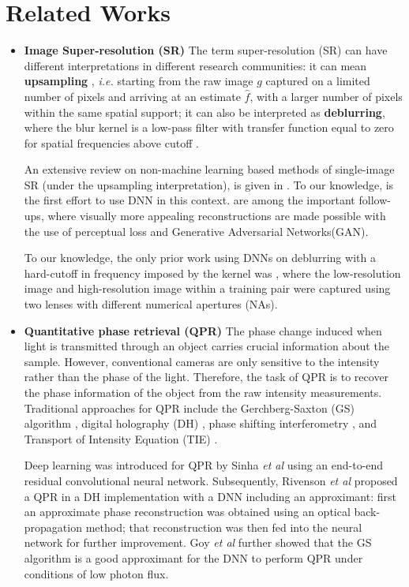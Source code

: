 \documentclass[10pt,twocolumn,letterpaper]{article}
\begin{document}
\section{Related Works}
\begin{itemize}
\item \textbf{Image Super-resolution (SR)}
The term super-resolution (SR) can have different interpretations in different research communities: it can mean \textbf{upsampling} \cite{dong2014learning}, {\it i.e.} starting from the raw image $g$ captured on a limited number of pixels and arriving at an estimate $\hat{f}$, with a larger number of pixels within the same spatial support; it can also be interpreted as \textbf{deblurring}, where the blur kernel is a low-pass filter with transfer function equal to zero for spatial frequencies above cutoff \cite{goodman2005introduction}. 

An extensive review on non-machine learning based methods of single-image SR (under the upsampling interpretation), is given in \cite{yang2014single}. To our knowledge, \cite{dong2014learning} is the first effort to use DNN in this context. \cite{johnson2016perceptual,ledig2017photo} are among the important follow-ups, where visually more appealing reconstructions are made possible with the use of perceptual loss\cite{johnson2016perceptual} and Generative Adversarial Networks(GAN)\cite{goodfellow2014generative}.

To our knowledge, the only prior work using DNNs on deblurring with a hard-cutoff in frequency imposed by the kernel was \cite{rivenson2017deep}, where the low-resolution image and high-resolution image within a training pair were captured using two lenses with different numerical apertures (NAs). 

\item \textbf{Quantitative phase retrieval (QPR)}
The phase change induced when light is transmitted through an object carries crucial information about the sample. However, conventional cameras are only sensitive to the intensity rather than the phase of the light. Therefore, the task of QPR is to recover the phase information of the object from the raw intensity measurements. 
Traditional approaches for QPR include the Gerchberg-Saxton (GS) algorithm \cite{gerchberg1972practical}, digital holography (DH) \cite{goodman1967digital}, phase shifting interferometry \cite{creath1985phase}, and Transport of Intensity Equation (TIE) \cite{teague1983deterministic}. 

Deep learning was introduced for QPR by Sinha \textit{et al} \cite{sinha2017lensless} using an end-to-end residual convolutional neural network\cite{he2016deep}. Subsequently, Rivenson \textit{et al} \cite{rivenson2018phase} proposed a QPR in a DH implementation with a DNN including an approximant: first  an approximate phase reconstruction was obtained using an optical back-propagation method; that reconstruction was then fed into the neural network for further improvement. Goy \textit{et al} \cite{goy2018low} further showed that the GS algorithm is a good approximant for the DNN to perform QPR under conditions of low photon flux.


\end{itemize}
\end{document}
